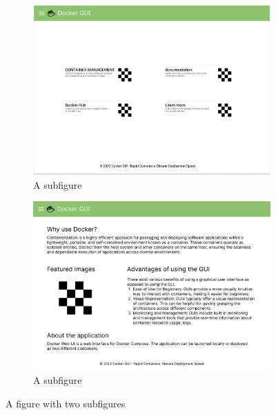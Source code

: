\documentclass[multi, tikz]{article}
\begin{document}
\begin{figure}
  \centering
  \begin{subfigure}{.5\textwidth}
    \centering
    \includegraphics[width=.95\linewidth]{diagrams/2.homepage.pdf}
    \caption{A subfigure}
    \label{fig:sub1}
  \end{subfigure}%
  \begin{subfigure}{.5\textwidth}
    \centering
    \includegraphics[width=.95\linewidth]{diagrams/5.docs.pdf}
    \caption{A subfigure}
    \label{fig:sub2}
  \end{subfigure}
  \caption{A figure with two subfigures}
  \label{fig:test}
\end{figure}
\end{document}
